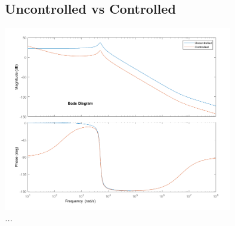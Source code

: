 \documentclass[11pt]{article}
\begin{document}
\begin{preview}
    \section{Uncontrolled vs Controlled}
    \begin{center}
        \includegraphics[width=0.75\textwidth]{img/comp.png}\\
        \textit{...}
    \end{center}
    

\end{preview}
\end{document}
